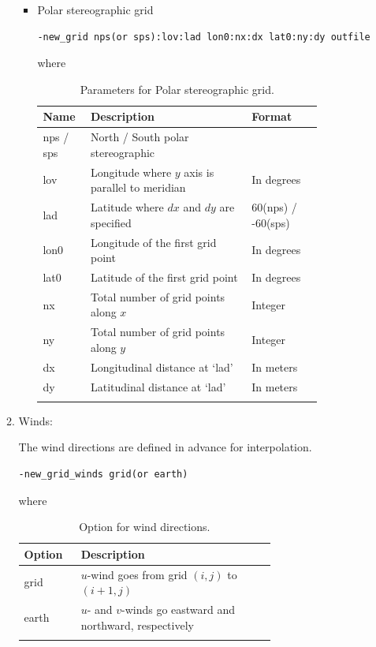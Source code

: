 \documentclass[11pt,fleqn]{report}              %
\begin{document}
\begin{enumerate}
\begin{enumerate}
\begin{itemize}
\item Polar stereographic grid
\lstset{language=bash}   
\begin{lstlisting}[frame=trBL]
-new_grid nps(or sps):lov:lad lon0:nx:dx lat0:ny:dy outfile
\end{lstlisting}
where
{
\fontsize{10}{12}\selectfont
\begin{longtable}{ p{0.1\linewidth} | p{0.5\linewidth} | p{0.22\linewidth} }
\hline
\hline
 Name & Description & Format \\
\hline
 nps / sps & North / South polar stereographic &  \\
 lov & Longitude where $y$ axis is parallel to meridian & In degrees \\
 lad & Latitude where $dx$ and $dy$ are specified & 60(nps) / -60(sps) \\
 lon0 & Longitude of the first grid point & In degrees \\
 lat0 & Latitude of the first grid point & In degrees \\
 nx & Total number of grid points along $x$ & Integer \\
 ny & Total number of grid points along $y$ & Integer \\
 dx & Longitudinal distance at `lad' & In meters \\
 dy & Latitudinal distance at `lad' & In meters \\
\hline
\caption{Parameters for Polar stereographic grid.}
\label{table:fv3grid_nps}
\end{longtable}
}
\end{itemize}

\item Winds:

The wind directions are defined in advance for interpolation.
\lstset{language=bash}   
\begin{lstlisting}[frame=trBL]
-new_grid_winds grid(or earth)
\end{lstlisting}
where
{
\fontsize{10}{12}\selectfont
\begin{longtable}{p{0.1\linewidth} | p{0.6\linewidth} }
\hline
\hline
 Option & Description  \\
\hline
 grid & $u$-wind goes from grid $(i,j)$ to $(i+1,j)$ \\
 earth & $u$- and $v$-winds go eastward and northward, respectively  \\
\hline
\caption{Option for wind directions.}
\label{table:fv3_upp_winds}
\end{longtable}
}


\end{enumerate}
\end{enumerate}
\end{document}

